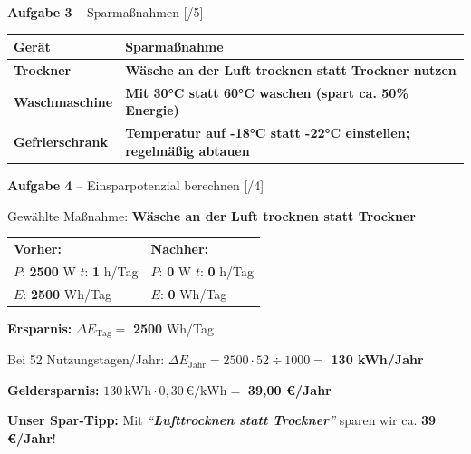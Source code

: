 \documentclass[11pt, a4paper]{article}
\newcommand{\lsg}[1]{\textcolor{loesung}{\textbf{#1}}}
\newcommand{\punktebox}[1]{\hfill\small\textcolor{mittelgrau}{[\hspace{0.8em}/#1]}}
\newcommand{\aufgabe}[2]{%
    \needspace{4\baselineskip}%
    \vspace{10pt}%
    \noindent\textbf{\textcolor{fachfarbe}{Aufgabe #1}} #2%
    \vspace{4pt}%
    \nopagebreak[4]%
}
\begin{document}

\aufgabe{3}{– Sparmaßnahmen} \punktebox{5}

\vspace{0.2em}
\small
\begin{tabular}{|p{3cm}|p{11.5cm}|}
\hline
\textbf{Gerät} & \textbf{Sparmaßnahme} \\
\hline
\lsg{Trockner} & \lsg{Wäsche an der Luft trocknen statt Trockner nutzen} \\
\hline
\lsg{Waschmaschine} & \lsg{Mit 30°C statt 60°C waschen (spart ca. 50\% Energie)} \\
\hline
\lsg{Gefrierschrank} & \lsg{Temperatur auf -18°C statt -22°C einstellen; regelmäßig abtauen} \\
\hline
\end{tabular}
\normalsize


\aufgabe{4}{– Einsparpotenzial berechnen} \punktebox{4}

Gewählte Maßnahme: \lsg{Wäsche an der Luft trocknen statt Trockner}

\vspace{0.3em}
\begin{tabular}{@{}p{7.5cm}p{7.5cm}@{}}
\textbf{Vorher:} & \textbf{Nachher:} \\
$P$: \lsg{2500} W \quad $t$: \lsg{1} h/Tag & $P$: \lsg{0} W \quad $t$: \lsg{0} h/Tag \\
$E$: \lsg{2500} Wh/Tag & $E$: \lsg{0} Wh/Tag
\end{tabular}

\vspace{0.3em}
\textbf{Ersparnis:} $\Delta E_{\text{Tag}} = $ \lsg{2500} Wh/Tag

Bei 52 Nutzungstagen/Jahr: $\Delta E_{\text{Jahr}} = 2500 \cdot 52 \div 1000 = $ \lsg{130 kWh/Jahr}

\vspace{0.2em}
\textbf{Geldersparnis:} $130\,\text{kWh} \cdot 0{,}30\,\text{€/kWh} = $ \lsg{39,00 €/Jahr}

\vspace{0.3em}
\begin{formelkasten}
\centering
\textbf{Unser Spar-Tipp:} Mit \textit{``\lsg{Lufttrocknen statt Trockner}''} sparen wir ca. \lsg{39 €/Jahr}!
\end{formelkasten}
\end{document}
